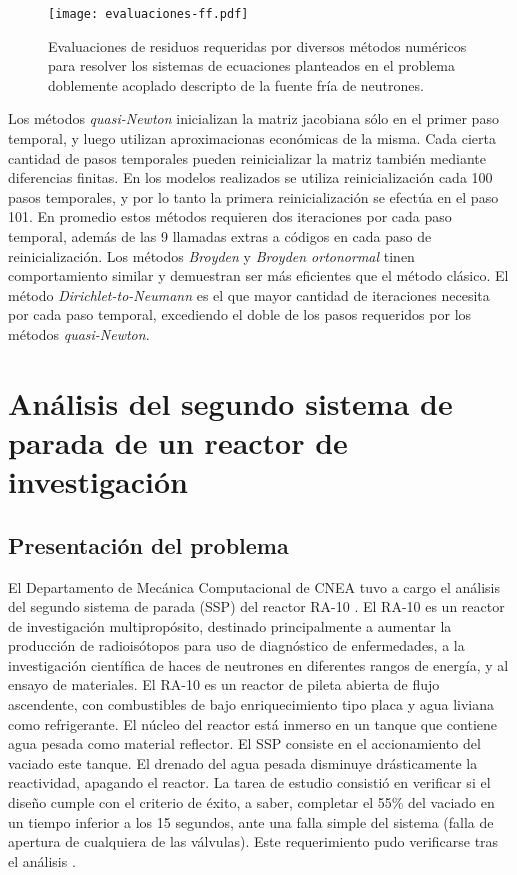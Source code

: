 \begin{figure}[ht]
\centering{}\texttt{[image: evaluaciones-ff.pdf]}
\caption
{Evaluaciones de residuos requeridas por diversos métodos numéricos para resolver los sistemas de ecuaciones planteados
 en el problema doblemente acoplado descripto de la fuente fría de neutrones.} \label{iteraciones_ri} 
\end{figure}

Los métodos \textit{quasi-Newton} inicializan la matriz jacobiana sólo en el primer paso temporal,
y luego utilizan aproximacionas económicas de la misma. 
Cada cierta cantidad de pasos temporales pueden reinicializar la matriz también mediante diferencias finitas. 
En los modelos realizados se utiliza reinicialización cada 100 pasos temporales, 
y por lo tanto la primera reinicialización se efectúa en el paso 101.
En promedio estos métodos requieren dos iteraciones por cada paso temporal, 
además de las 9 llamadas extras a códigos en cada paso de reinicialización.
Los métodos \textit{Broyden} y \textit{Broyden ortonormal} tinen comportamiento similar y demuestran ser más eficientes que el método clásico.
El método \textit{Dirichlet-to-Neumann} es el que mayor cantidad de iteraciones necesita por cada paso temporal, 
excediendo el doble de los pasos requeridos por los métodos \textit{quasi-Newton}.

\section{Análisis del segundo sistema de parada de un reactor de investigación}
\label{3:mockup}

\subsection*{Presentación del problema}
El Departamento de Mecánica Computacional de CNEA tuvo a cargo el análisis del segundo sistema de parada (SSP) del reactor RA-10 \cite{ra10}.
El RA-10 es un reactor de investigación multipropósito, destinado principalmente a aumentar la producción de radioisótopos para uso de diagnóstico de enfermedades,
a la investigación científica de haces de neutrones en diferentes rangos de energía,
y al ensayo de materiales.
El RA-10 es un reactor de pileta abierta de flujo ascendente, con combustibles de bajo enriquecimiento tipo placa y agua liviana como refrigerante.
El núcleo del reactor está inmerso en un tanque que contiene agua pesada como material reflector.
El SSP consiste en el accionamiento del vaciado este tanque.
El drenado del agua pesada disminuye drásticamente la reactividad, apagando el reactor.
La tarea de estudio consistió en verificar si el diseño cumple con el criterio de éxito,
a saber, completar el 55\% del vaciado en un tiempo inferior a los 15 segundos,
ante una falla simple del sistema (falla de apertura de cualquiera de las válvulas).
Este requerimiento pudo verificarse tras el análisis \cite{cnea-informe-ra10}.

